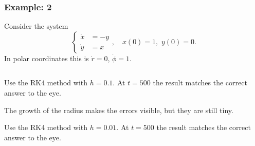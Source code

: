 \documentclass{beamer}
\begin{document}
\begin{frame}
  \frametitle{Example: 2}


  Consider the system
  \begin{equation*}
    \left\{
      \begin{aligned}
        \dot{x} & = -y \\ \dot{y} & = x
      \end{aligned} \right., \quad x(0) = 1, \, \, y(0) = 0.
  \end{equation*}
  In polar coordinates this is $\dot{r} = 0$, $\dot{\phi} = 1$.
  \begin{columns}
    \begin{column}{0.5\textwidth}
      \begin{overlayarea}{\textwidth}{0.4\textheight}
        {
          Use the RK4 method with $h=0.1$. At $t=500$ the
          result matches the correct answer to the eye.
        }
        {

          \vspace{1ex}
          The growth of the radius makes the errors visible, but they
          are still tiny.

        }
        {
          Use the RK4 method with $h=0.01$. At $t=500$
          the result matches the correct answer to the eye.
        }
        {

}
\end{overlayarea}
\end{column}
\end{columns}
\end{frame}
\end{document}

